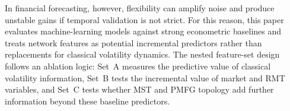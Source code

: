 In financial forecasting, however, flexibility can amplify noise and produce unstable gains if temporal validation is not strict. For this reason, this paper evaluates machine-learning models against strong econometric baselines and treats network features as potential incremental predictors rather than replacements for classical volatility dynamics. The nested feature-set design follows an ablation logic: Set~A measures the predictive value of classical volatility information, Set~B tests the incremental value of market and RMT variables, and Set~C tests whether MST and PMFG topology add further information beyond these baseline predictors.